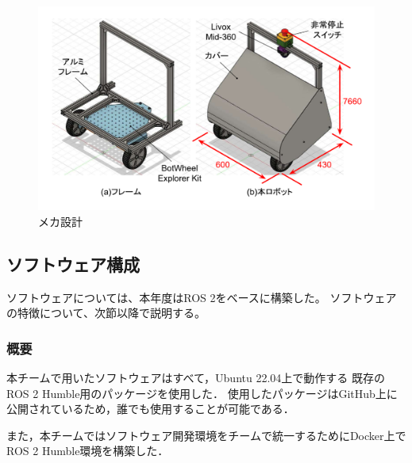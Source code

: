 \documentclass[twocolumn,9pt]{jsproceedings}
\begin{document}
\begin{figure}[h]
  \begin{center}
    \includegraphics[width=1.0\linewidth]{figs/robot_flame.pdf}
    \caption{メカ設計}
    \label{fig:robot_flame}
  \end{center}
\end{figure}

\subsection{ソフトウェア構成}

ソフトウェアについては、本年度はROS 2\cite{ROS 2}をベースに構築した。
ソフトウェアの特徴について、次節以降で説明する。


\subsubsection{概要}
本チームで用いたソフトウェアはすべて，Ubuntu 22.04上で動作する
既存のROS 2 Humble用のパッケージを使用した．
使用したパッケージはGitHub上に公開されているため，誰でも使用することが可能である．

また，本チームではソフトウェア開発環境をチームで統一するためにDocker上でROS 2 Humble環境を構築した．
\end{document}
